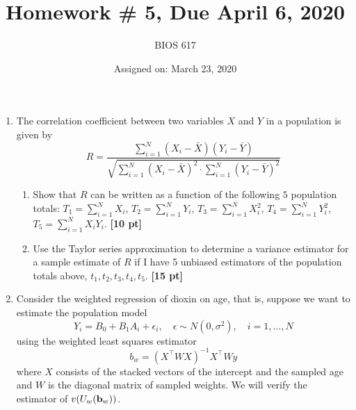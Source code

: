 \documentclass[12pt]{article}
\begin{document}
\title{Homework \# 5, Due April 6, 2020}
\author{BIOS 617}
\date{Assigned on: March 23, 2020}

\maketitle

\begin{enumerate}
\setlength{\itemsep}{15pt}%
\setlength{\parskip}{15pt}%

\item  The correlation coefficient between two variables $X$ and $Y$ in a population is given by
$$
R = \frac{ \sum_{i=1}^N (X_i - \bar X) (Y_i - \bar Y) }{ \sqrt{\sum_{i=1}^N (X_i - \bar X)^2 \cdot \sum_{i=1}^N (Y_i - \bar Y)^2 }}
$$
	\begin{enumerate}[itemsep=5ex]
	\item Show that $R$ can be written as a function of the following $5$ population totals: $T_1 = \sum_{i=1}^N X_i$, $T_2 = \sum_{i=1}^N Y_i$, $T_3 = \sum_{i=1}^N X_i^2$, $T_4 = \sum_{i=1}^N Y_i^2$, $T_5 = \sum_{i=1}^N X_i Y_i$. {\bf [10 pt]}
	\item Use the Taylor series approximation to determine a variance estimator for a sample estimate of $R$ if I have 5 unbiased estimators of the population totals above, $t_1,t_2,t_3,t_4,t_5$. {\bf [15 pt]}
	\end{enumerate}
\item Consider the weighted regression of dioxin on age, that is, suppose we want to estimate the population model
$$
Y_i = B_0 + B_1 A_i + \epsilon_i, \quad \epsilon \sim N(0,\sigma^2), \quad i=1,\ldots, N
$$
using the weighted least squares estimator
$$
b_w = \left( X^\top W X \right)^{-1} X^\top W y
$$
where $X$ consists of the stacked vectors of the intercept and the sampled age and $W$ is the diagonal matrix of sampled weights. We will verify the estimator of $v(U_w ({\bf b}_w))$.


\end{enumerate}
\end{document}
